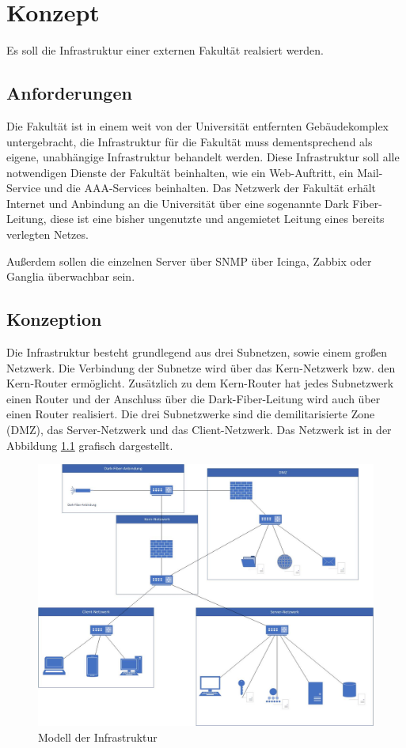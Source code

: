 \chapter{Konzept}
Es soll die Infrastruktur einer externen Fakultät realsiert werden.

\section{Anforderungen}
Die Fakultät ist in einem weit von der Universität entfernten Gebäudekomplex untergebracht, die Infrastruktur für die Fakultät muss dementsprechend als eigene, unabhängige Infrastruktur behandelt werden. Diese Infrastruktur soll alle notwendigen Dienste der Fakultät beinhalten, wie ein Web-Auftritt, ein Mail-Service und die AAA-Services beinhalten.
Das Netzwerk der Fakultät erhält Internet und Anbindung an die Universität über eine sogenannte Dark Fiber-Leitung, diese ist eine bisher ungenutzte und angemietet Leitung eines bereits verlegten Netzes.

Außerdem sollen die einzelnen Server über SNMP über Icinga, Zabbix oder Ganglia überwachbar sein.

\section{Konzeption}
Die Infrastruktur besteht grundlegend aus drei Subnetzen, sowie einem großen Netzwerk. Die Verbindung der Subnetze wird über das Kern-Netzwerk bzw. den Kern-Router ermöglicht. Zusätzlich zu dem Kern-Router hat jedes Subnetzwerk einen Router und der Anschluss über die Dark-Fiber-Leitung wird auch über einen Router realisiert. Die drei Subnetzwerke sind die demilitarisierte Zone (DMZ), das Server-Netzwerk und das Client-Netzwerk. Das Netzwerk ist in der Abbildung \ref{fig:model} grafisch dargestellt.

\begin{figure}[H]
  \includegraphics[width=\linewidth]{pictures/netzwerk-diagramm.jpg}
  \caption{Modell der Infrastruktur}
  \label{fig:model}
\end{figure}

